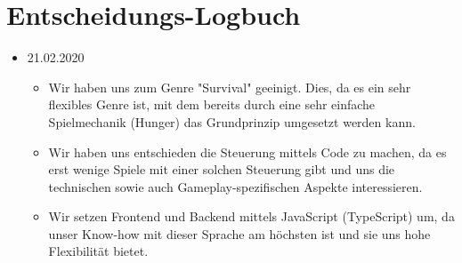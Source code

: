 \documentclass[a4paper, 11pt]{scrartcl}
\let\oldsection\section
\renewcommand\section{\clearpage\oldsection}
\begin{document}
\section{Entscheidungs-Logbuch}

\begin{itemize}
\item 21.02.2020
\begin{itemize}
\item Wir haben uns zum Genre "Survival" geeinigt. Dies, da es ein sehr flexibles Genre ist, mit dem bereits durch eine sehr einfache Spielmechanik (Hunger) das Grundprinzip umgesetzt werden kann.
\item Wir haben uns entschieden die Steuerung mittels Code zu machen, da es erst wenige Spiele mit einer solchen Steuerung gibt und uns die technischen sowie auch Gameplay-spezifischen Aspekte interessieren.
\item Wir setzen Frontend und Backend mittels JavaScript (TypeScript) um, da unser Know-how mit dieser Sprache am höchsten ist und sie uns hohe Flexibilität bietet.
\end{itemize}
\end{itemize}

\clearpage

\printglossary[type=\acronymtype]

\printglossary
\end{document}
